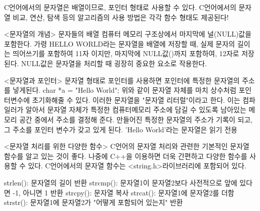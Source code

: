 C언어에서의 문자열은 배열이므로, 포인터 형태로 사용할 수 있다.
C언어에서의 문자열 비교, 연산, 탐색 등의 알고리즘의 사용 방법은 각각 함수 형태도 제공된다!


<문자열의 개념>
    문자들의 배열
    컴퓨터 메모리 구조상에서 마지막에 널(NULL)값을 포함한다.
    가령 HELLO WORLD라는 문자열을 배열에 저장할 때,
    실제 문자의 길이는 띄어쓰기를 포함하여 11자 이지만,
    마지막에 NULL값(\0)까지 포함하여, 12자로 저장된다.
    NULL값은 문자열을 처리할 때 굉장히 중요한 요소로 작용한다.

<문자열과 포인터>
    문자열 형태로 포인터를 사용하면 포인터에 특정한 문자열의 주소를 넣게된다.
    char *a = "Hello World";
    위와 같이 문자열 자체를 마치 상수처럼 포인터변수에 초기화해줄 수 있다.
    이러한 문자열을 "문자열 리터럴"이라고 한다.
    이는 컴파일러가 알아서 문자열 자체가 특정한 컴퓨터메모리 주소에 담길 수 있도록 남아있는 메모리 공간 중에서 주소를 결정해 준다.
    만들어진 특정한 문자열의 주소가 기록이 되고, 그 주소를 포인터 변수가 갖고 있게 된다.
    'Hello World'라는 문자열은 읽기 전용

<문자열 처리를 위한 다양한 함수>
    C언어의 문자열 처리와 관련한 기본적인 문자열 함수를 알고 있는 것이 좋다.
    나중에 C++을 이용하면 더욱 간편하고 다양한 함수를 사용할 수 있다.
    C언어에서의 문자열 함수는 <string.h>라이브러리에 포함되어 있다.

    strlen(): 문자열의 길이 반환
    strcmp(): 문자열1이 문자열2보다 사전적으로 앞에 있다면 -1, 아니면 1 반환
    strcpy(): 문자열 복사
    strcat(): 문자열1에 문자열2를 더함
    strstr(): 문자열1에 문자열2가 "어떻게 포함되어 있는지" 반환